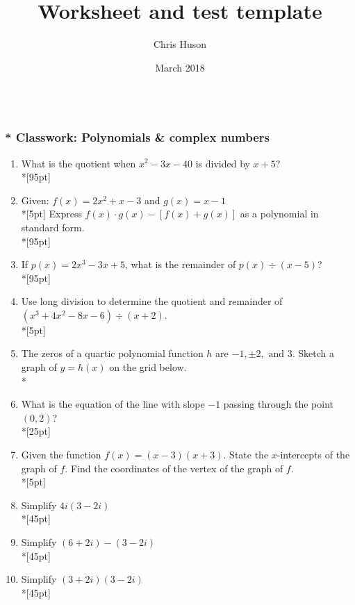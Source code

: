 \documentclass[12pt, oneside]{article}
\title{Worksheet and test template}
\author{Chris Huson}
\date{March 2018}
\begin{document}
\subsubsection*{\\* Classwork: Polynomials \& complex numbers}

\begin{enumerate}
\item What is the quotient when $x^2-3x-40$ is divided by $x + 5$?\\*[95pt]

\item Given: $f(x)=2x^2+ x - 3$ and $g(x)=x-1$\\*[5pt]
Express $f(x) \cdot g(x) - [f(x) + g(x)]$ as a polynomial in standard form.\\*[95pt] %

\item If $p(x)=2x^3-3x+5$, what is the remainder of $p(x) \div (x-5)$? %
\\*[95pt]

\item Use long division to determine the quotient and remainder of $(x^3+4x^2-8x-6) \div (x+2)$.\\*[5pt]

\newpage

\item The zeros of a quartic polynomial function $h$ are  $-1,\pm 2, \text{ and } 3$. Sketch a graph of $y = h(x)$ on the grid below.\\*
\begin{center}
\end{center}

\item What is the equation of the line with slope $-1$ passing through the point $(0, 2)$?\\*[25pt]


\item Given the function $f(x)=(x-3)(x+3)$. State the $x$-intercepts of the graph of $f$. Find the coordinates of the vertex of the graph of $f$.\\*[5pt]


\newpage

\item Simplify $4i(3-2i)$\\*[45pt]
\item Simplify $(6+2i)-(3-2i)$\\*[45pt]
\item Simplify $(3+2i)(3-2i)$\\*[45pt]


\end{enumerate}
\end{document}

